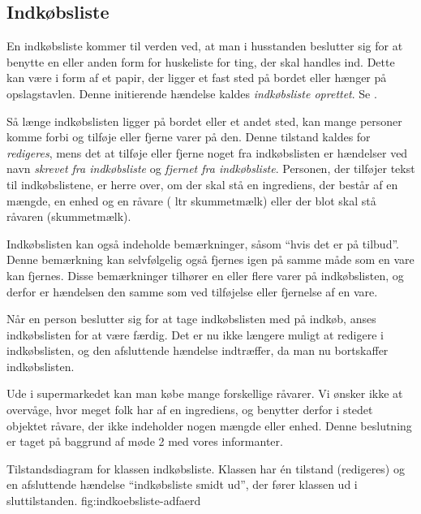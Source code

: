 \subsection{Indkøbsliste}
En indkøbsliste kommer til verden ved, at man i husstanden beslutter sig for at benytte en eller anden form for huskeliste for ting, der skal handles ind. Dette kan være i form af et papir, der ligger et fast sted på bordet eller hænger på opslagstavlen. Denne initierende hændelse kaldes \textit{indkøbsliste oprettet}. Se .

Så længe indkøbslisten ligger på bordet eller et andet sted, kan mange personer komme forbi og tilføje eller fjerne varer på den. Denne tilstand kaldes for \textit{redigeres}, mens det at tilføje eller fjerne noget fra indkøbslisten er hændelser ved navn \textit{skrevet fra indkøbsliste} og \textit{fjernet fra indkøbsliste}. Personen, der tilføjer tekst til indkøbslistene, er herre over, om der skal stå en ingrediens, der består af en mængde, en enhed og en råvare ( ltr skummetmælk) eller der blot skal stå råvaren (\fx skummetmælk).

Indkøbslisten kan også indeholde bemærkninger, såsom ``hvis det er på tilbud''. Denne bemærkning kan selvfølgelig også fjernes igen på samme måde som en vare kan fjernes. Disse bemærkninger tilhører en eller flere varer på indkøbslisten, og derfor er hændelsen den samme som ved tilføjelse eller fjernelse af en vare.

Når en person beslutter sig for at tage indkøbslisten med på indkøb, anses indkøbslisten for at være færdig. Det er nu ikke længere muligt at redigere i indkøbslisten, og den afsluttende hændelse indtræffer, da man nu bortskaffer indkøbslisten. 

Ude i supermarkedet kan man købe mange forskellige råvarer. Vi ønsker ikke at overvåge, hvor meget folk har af en ingrediens, og benytter derfor i stedet objektet råvare, der ikke indeholder nogen mængde eller enhed. Denne beslutning er taget på baggrund af møde 2 med vores informanter.

  {Tilstandsdiagram for klassen indkøbsliste. Klassen har én tilstand (redigeres) og en afsluttende hændelse ``indkøbsliste smidt ud'', der fører klassen ud i sluttilstanden.}
  {fig:indkoebsliste-adfaerd}
